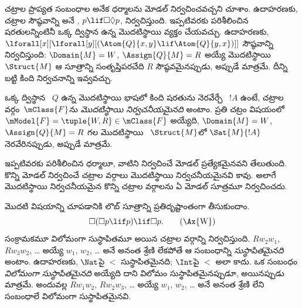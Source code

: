\documentclass[../../../include/open-logic-section]{subfiles}
\begin{document}


చట్రాల ప్రాప్యత సంబంధాల అనేక ధర్మాలను మోడల్
 నిర్వచించవచ్చని చూశాం. ఉదాహరణకు,
చట్రాల సౌష్ఠవాన్ని  అనే ,
$p \lif \Box\Diamond p$, నిర్వచిస్తుంది. ఇప్పటివరకు పరిశీలించిన
షరతులన్నింటినీ ఒక్క ద్విస్థాన 
ఉన్న  మొదటిస్థాయి
 వ్యక్తం చేయవచ్చు. ఉదాహరణకు,
$\lforall[x][\lforall[y][(\Atom{Q}{x,y} \lif \Atom{Q}{y, x})]]$
సౌష్ఠవాన్ని నిర్వచిస్తుంది: $\Domain{M} = W$,
$\Assign{Q}{M} = R$ అయ్యే మొదటిస్థాయి
~$\Struct{M}$ ఆ సూత్రాన్ని
సంతృప్తిపరచేది $R$ సౌష్ఠవమైనప్పుడు, అప్పుడే మాత్రమే. దీన్ని బట్టి కింది
నిర్వచనాన్ని ఇవ్వవచ్చు.

\begin{defn}
  ఒక్క ద్విస్థాన ~$Q$ ఉన్న
  మొదటిస్థాయి భాషలో కింది షరతును నెరవేర్చే
  ~$!A$ ఉంటే, చట్రాల వర్గం~$\mClass{F}$ను
  \emph{మొదటిస్థాయి నిర్వచనీయమైనది} అంటాం. ప్రతి చట్రం విషయంలో
  $\mModel{F} = \tuple{W, R} \in \mClass{F}$ అయ్యేది,
  $\Domain{M} = W$, $\Assign{Q}{M} = R$ గల
  మొదటిస్థాయి ~$\Struct{M}$లో
  $\Sat{M}{!A}$ నెరవేరినప్పుడు, అప్పుడే మాత్రమే.
\end{defn}

ఇప్పటివరకు పరిశీలించిన ధర్మాలూ, వాటిని నిర్వచించే మోడల్
 ప్రత్యేకమైనవని తేలుతుంది.
కొన్ని మోడల్  నిర్వచించే
చట్రాల వర్గాలు మొదటిస్థాయి నిర్వచనీయమైనవి కావు.
అలాగే మొదటిస్థాయి నిర్వచనీయమైన కొన్ని చట్రాల వర్గాలను
ఏ మోడల్ సూత్రమూ నిర్వచించదు.

మొదటి విషయాన్ని చూపడానికి లొబ్ సూత్రాన్ని ప్రతిదృష్టాంతంగా తీసుకుందాం.
\begin{equation}
\Box(\Box p \lif p) \lif \Box p. \tag{\Ax{W}}
\end{equation}
 సంక్రామకమూ విలోమంగా సుస్థాపితమూ అయిన చట్రాల
వర్గాన్ని నిర్వచిస్తుంది. $Rw_2w_1$, $Rw_3w_2$, \dots{} అయ్యే
$w_1$, $w_2$, \dots{} అనే అనంత శ్రేణి లేకపోతే ఆ సంబంధాన్ని
\emph{సుస్థాపితమైనది} అంటాం. ఉదాహరణకు, $\Nat$పై $<$
సుస్థాపితమైనది; $\Int$పై $<$ అలా కాదు. ఒక సంబంధం
\emph{విలోమంగా సుస్థాపితమైనది} అయ్యేది దాని విలోమం
సుస్థాపితమైనప్పుడూ, అయినప్పుడు మాత్రమే. అందువల్ల $Rw_1w_2$, $Rw_2w_3$, \dots{}
అయ్యే $w_1$, $w_2$, \dots{} అనే అనంత శ్రేణి లేని సంబంధాలే
విలోమంగా సుస్థాపితమైనవి.
\end{document}
